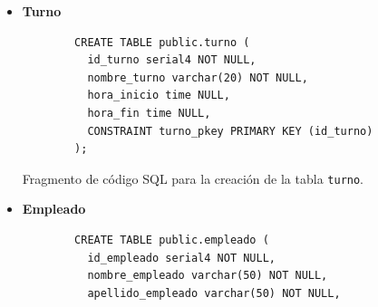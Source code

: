 \begin{itemize}
    \item \textbf{Turno}
    \begin{listing}[H]
        \centering
        \begin{verbatim}
        CREATE TABLE public.turno (
          id_turno serial4 NOT NULL,
          nombre_turno varchar(20) NOT NULL,
          hora_inicio time NULL,
          hora_fin time NULL,
          CONSTRAINT turno_pkey PRIMARY KEY (id_turno)
        );
        \end{verbatim}
        \caption{Fragmento de código SQL para la creación de la tabla \texttt{turno}.}
        \label{lst:turno}
    \end{listing}
    \item \textbf{Empleado}
    \begin{listing}[H]
        \centering
        \begin{verbatim}
        CREATE TABLE public.empleado (
          id_empleado serial4 NOT NULL,
          nombre_empleado varchar(50) NOT NULL,
          apellido_empleado varchar(50) NOT NULL,

\end{verbatim}
\end{listing}
\end{itemize}
